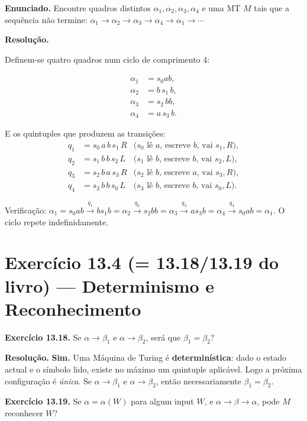 \documentclass[12pt,a4paper]{article}
\newcommand{\keyword}[1]{\textbf{\textcolor{azul}{#1}}}
\begin{document}
\textbf{Enunciado.} Encontre quadros distintos $\alpha_1, \alpha_2, \alpha_3, \alpha_4$
e uma MT $M$ tais que a sequência não termine:
$\alpha_1 \to \alpha_2 \to \alpha_3 \to \alpha_4 \to \alpha_1 \to \cdots$

\medskip
\textbf{Resolução.}

Definem-se quatro quadros num ciclo de comprimento 4:

\begin{align*}
  \alpha_1 &= s_0 ab,\\
  \alpha_2 &= b\,s_1\,b,\\
  \alpha_3 &= s_2\,bb,\\
  \alpha_4 &= a\,s_3\,b.
\end{align*}

E os quintuples que produzem as transições:
\begin{align*}
  q_1 &= s_0\,a\,b\,s_1\,R &\text{($s_0$ lê $a$, escreve $b$, vai } s_1, R\text{)},\\
  q_2 &= s_1\,b\,b\,s_2\,L &\text{($s_1$ lê $b$, escreve $b$, vai } s_2, L\text{)},\\
  q_3 &= s_2\,b\,a\,s_3\,R &\text{($s_2$ lê $b$, escreve $a$, vai } s_3, R\text{)},\\
  q_4 &= s_3\,b\,b\,s_0\,L &\text{($s_3$ lê $b$, escreve $b$, vai } s_0, L\text{)}.
\end{align*}

Verificação: $\alpha_1 = s_0 ab \xrightarrow{q_1} bs_1b = \alpha_2 \xrightarrow{q_2}
s_2 bb = \alpha_3 \xrightarrow{q_3} as_3 b = \alpha_4 \xrightarrow{q_4} s_0 ab = \alpha_1$.
O ciclo repete indefinidamente.

\section*{Exercício 13.4 (= 13.18/13.19 do livro) — Determinismo e Reconhecimento}

\textbf{Exercício 13.18.} Se $\alpha \to \beta_1$ e $\alpha \to \beta_2$, será que $\beta_1 = \beta_2$?

\medskip
\textbf{Resolução.} \textbf{Sim.} Uma Máquina de Turing é \keyword{determinística}: dado
o estado actual e o símbolo lido, existe no máximo um quintuple aplicável. Logo a próxima
configuração é \emph{única}. Se $\alpha \to \beta_1$ e $\alpha \to \beta_2$, então
necessariamente $\beta_1 = \beta_2$.

\medskip

\textbf{Exercício 13.19.} Se $\alpha = \alpha(W)$ para algum input $W$, e $\alpha \to \beta \to \alpha$,
pode $M$ reconhecer $W$?
\end{document}
